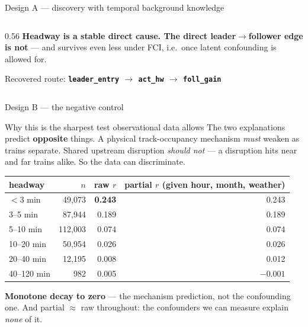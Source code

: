 \documentclass[aspectratio=169,10pt]{beamer}
\newcommand{\srcnote}[1]{{\scriptsize\color{ink3}#1}}
\newcommand{\hl}[1]{{\color{corange}\textbf{#1}}}
\begin{document}
\begin{frame}{Design A --- discovery with temporal background knowledge}
\begin{columns}[T]
\begin{column}{0.56\textwidth}
      \vspace{0.7em}
      \textbf{Headway is a stable direct cause. The direct leader$\to$follower edge is not}
      --- and survives even less under FCI, i.e.\ once latent confounding is allowed for.

      \vspace{0.3em}
      Recovered route: \hl{\texttt{leader\_entry} $\to$ \texttt{act\_hw} $\to$ \texttt{foll\_gain}}
    \end{column}
  \end{columns}
\end{frame}

\begin{frame}{Design B --- the negative control}
  \begin{block}{\small Why this is the sharpest test observational data allows}
    \small The two explanations predict \textbf{opposite} things.
    A physical track-occupancy mechanism \emph{must} weaken as trains separate.
    Shared upstream disruption \emph{should not} --- a disruption hits near and far trains
    alike. So the data can discriminate.
  \end{block}

  \vspace{0.5em}
  \centering
  \begin{tabular}{@{}lrrr@{}}
    \toprule
    headway & $n$ & raw $r$ & partial $r$ \srcnote{(given hour, month, weather)} \\
    \midrule
    $<$3 min & 49{,}073 & \textbf{0.243} & 0.243 \\
    3--5 min & 87{,}944 & 0.189 & 0.189 \\
    5--10 min & 112{,}003 & 0.074 & 0.074 \\
    10--20 min & 50{,}954 & 0.026 & 0.026 \\
    20--40 min & 12{,}195 & 0.008 & 0.012 \\
    40--120 min & 982 & 0.005 & $-0.001$ \\
    \bottomrule
  \end{tabular}

  \vspace{0.7em}
  \raggedright
  \hl{Monotone decay to zero} --- the mechanism prediction, not the confounding one.
  And partial $\approx$ raw throughout: the confounders we can measure explain \emph{none}
  of it.
\end{frame}
\end{document}
